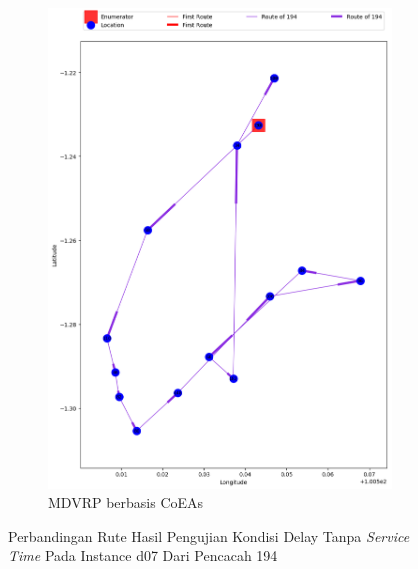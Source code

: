 \begin{figure}[H]
	\centering
	\begin{subfigure}[t]{\textwidth}
		\centering
		\includegraphics[width=\textwidth]{Resources/Images/delayed_7/real_m15_n100_delayed_7_194_coes}
		\caption{MDVRP berbasis CoEAs}
		\label{fig:real_m15_n100_delayed_7_194_coes}
	\end{subfigure}
	\caption{Perbandingan Rute Hasil Pengujian Kondisi Delay Tanpa \textit{Service Time} Pada Instance d07 Dari Pencacah 194}
	\label{fig:real_m15_n100_delayed_7_194}
\end{figure}


